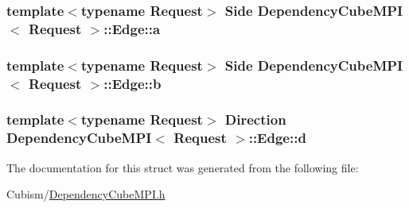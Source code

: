 \subsubsection[{a}]{\setlength{\rightskip}{0pt plus 5cm}template$<$typename Request$>$ Side {\bf Dependency\+Cube\+M\+P\+I}$<$ Request $>$\+::Edge\+::a}\label{struct_dependency_cube_m_p_i_1_1_edge_a08c5f45fa42aa4b3d2177c07f00eb076}
\hypertarget{struct_dependency_cube_m_p_i_1_1_edge_a017525e4ab3ec35aa19a4de2c7b6ebc1}{}
\subsubsection[{b}]{\setlength{\rightskip}{0pt plus 5cm}template$<$typename Request$>$ Side {\bf Dependency\+Cube\+M\+P\+I}$<$ Request $>$\+::Edge\+::b}\label{struct_dependency_cube_m_p_i_1_1_edge_a017525e4ab3ec35aa19a4de2c7b6ebc1}
\hypertarget{struct_dependency_cube_m_p_i_1_1_edge_a8669784b9f597960def87cc96ebd0e1f}{}
\subsubsection[{d}]{\setlength{\rightskip}{0pt plus 5cm}template$<$typename Request$>$ Direction {\bf Dependency\+Cube\+M\+P\+I}$<$ Request $>$\+::Edge\+::d}\label{struct_dependency_cube_m_p_i_1_1_edge_a8669784b9f597960def87cc96ebd0e1f}


The documentation for this struct was generated from the following file\+:\begin{DoxyCompactItemize}
\item 
Cubism/\hyperlink{_dependency_cube_m_p_i_8h}{Dependency\+Cube\+M\+P\+I.\+h}\end{DoxyCompactItemize}
